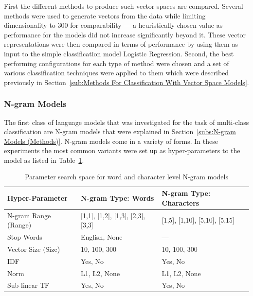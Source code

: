 First the different methods to produce such vector spaces are compared. Several methods were used to generate vectors from the data while limiting dimensionality to 300 for comparability --- a heuristically chosen value as performance for the models did not increase significantly beyond it. These vector representations were then compared in terms of performance by using them as input to the simple classification model Logistic Regression.
Second, the best performing configurations for each type of method were chosen and a set of various classification techniques were applied to them which were described previously in Section~\ref{sub:Methods For Classification With Vector Space Models}.

\subsubsection{N-gram Models}
\label{subs:N-gram Models (Experimental Results)}

The first class of language models that was investigated for the task of multi-class classification are N-gram models that were explained in Section~\ref{subs:N-gram Models (Methods)}.
N-gram models come in a variety of forms. In these experiments the most common variants were set up as hyper-parameters to the model as  listed in Table~\ref{tab:N-gram Hyper-parameters Space}.

\begin{table}[h]
  \begin{center}
  \begin{tabular}{ l l l}
    \toprule
    Hyper-Parameter & N-gram Type: Words & N-gram Type: Characters \\
    \midrule
    N-gram Range (Range) & [1,1], [1,2], [1,3], [2,3], [3,3] & [1,5], [1,10], [5,10], [5,15] \\
    Stop Words & English, None & --- \\
    Vector Size (Size) & 10, 100, 300 & 10, 100, 300 \\
    IDF & Yes, No & Yes, No \\
    Norm & L1, L2, None & L1, L2, None \\
    Sub-linear TF & Yes, No & Yes, No \\
    \bottomrule
  \end{tabular}
  \caption{Parameter search space for word and character level N-gram models}
\label{tab:N-gram Hyper-parameters Space}
\end{center}
\end{table}

